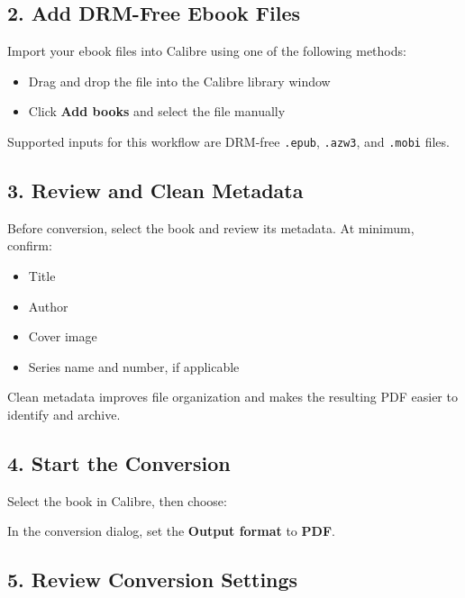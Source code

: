 \documentclass[11pt]{article}
\begin{document}
\subsection{2. Add DRM-Free Ebook Files}

Import your ebook files into Calibre using one of the following methods:

\begin{itemize}
    \item Drag and drop the file into the Calibre library window
    \item Click \textbf{Add books} and select the file manually
\end{itemize}

\noindent Supported inputs for this workflow are DRM-free \texttt{.epub}, \texttt{.azw3}, and \texttt{.mobi} files.

\subsection{3. Review and Clean Metadata}

Before conversion, select the book and review its metadata. At minimum, confirm:

\begin{itemize}
    \item Title
    \item Author
    \item Cover image
    \item Series name and number, if applicable
\end{itemize}

\noindent Clean metadata improves file organization and makes the resulting PDF easier to identify and archive.

\subsection{4. Start the Conversion}

Select the book in Calibre, then choose:

\begin{center}
\end{center}

\noindent In the conversion dialog, set the \textbf{Output format} to \textbf{PDF}.

\subsection{5. Review Conversion Settings}
\end{document}
